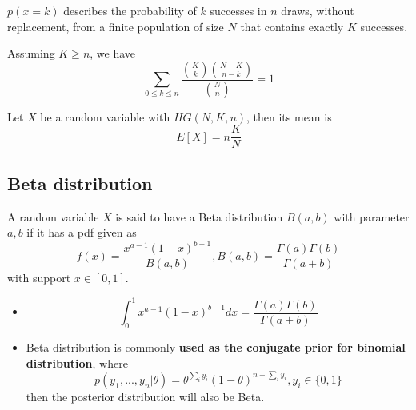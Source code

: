 \begin{refsection}
\begin{definition}
\end{definition}


\begin{remark}[interpretation]
	$p(x = k)$ describes the probability of  $k$ successes in  $n$ draws, without replacement, from a finite population of size $N$ that contains exactly $K$ successes.
\end{remark}

\begin{lemma}
Assuming $K\geq n$, we have
	$$\sum_{0\leq k\leq n} \frac{\binom{K}{k}\binom{N-K}{n-k}}{\binom{N}{n}} = 1$$
\end{lemma}

\begin{lemma}\cite[148]{hoggintroduction}
Let $X$ be a random variable with $HG(N,K,n)$, then its mean is
$$E[X] = n\frac{K}{N}$$
\end{lemma}



\subsection{Beta distribution}
\begin{definition}\cite[43]{murphy2012machine}
	A random variable $X$ is said to have a Beta distribution $B(a,b)$ with parameter $a,b$ if it has a pdf given as
	$$f(x) = \frac{x^{a-1}(1-x)^{b-1}}{B(a,b)},B(a,b)=\frac{\Gamma(a)\Gamma(b)}{\Gamma(a+b)}$$
	with support $x\in [0,1]$.
\end{definition}





\begin{remark}\hfill
	\begin{itemize}
		\item $$\int_0^1 x^{a-1}(1-x)^{b-1} dx = \frac{\Gamma(a)\Gamma(b)}{\Gamma(a+b)}$$
		\item Beta distribution is commonly \textbf{used as the conjugate prior for binomial distribution}, where
		$$p(y_1,...,y_n|\theta) = \theta^{\sum_i y_i}(1-\theta)^{n-\sum_i y_i},y_i\in \{0,1\}$$
		then the posterior distribution will also be Beta.
	\end{itemize}
\end{remark}




\end{refsection}
